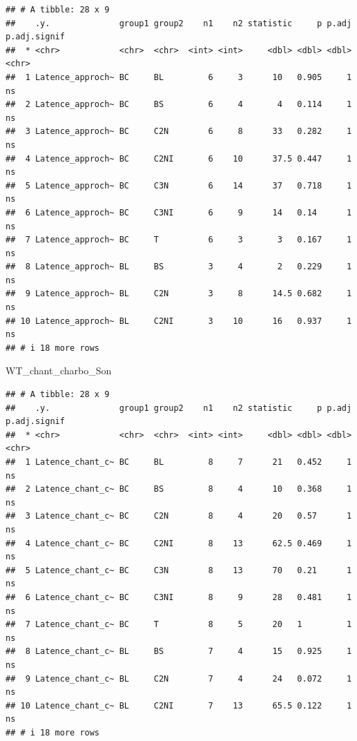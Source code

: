 \documentclass[
  french,
]{article}
\newenvironment{Shaded}{\begin{snugshade}}{\end{snugshade}}
\newcommand{\NormalTok}[1]{#1}
\begin{document}
\begin{verbatim}
## # A tibble: 28 x 9
##    .y.              group1 group2    n1    n2 statistic     p p.adj p.adj.signif
##  * <chr>            <chr>  <chr>  <int> <int>     <dbl> <dbl> <dbl> <chr>       
##  1 Latence_approch~ BC     BL         6     3      10   0.905     1 ns          
##  2 Latence_approch~ BC     BS         6     4       4   0.114     1 ns          
##  3 Latence_approch~ BC     C2N        6     8      33   0.282     1 ns          
##  4 Latence_approch~ BC     C2NI       6    10      37.5 0.447     1 ns          
##  5 Latence_approch~ BC     C3N        6    14      37   0.718     1 ns          
##  6 Latence_approch~ BC     C3NI       6     9      14   0.14      1 ns          
##  7 Latence_approch~ BC     T          6     3       3   0.167     1 ns          
##  8 Latence_approch~ BL     BS         3     4       2   0.229     1 ns          
##  9 Latence_approch~ BL     C2N        3     8      14.5 0.682     1 ns          
## 10 Latence_approch~ BL     C2NI       3    10      16   0.937     1 ns          
## # i 18 more rows
\end{verbatim}

\begin{Shaded}
\begin{Highlighting}[]
\NormalTok{WT\_chant\_charbo\_Son}
\end{Highlighting}
\end{Shaded}

\begin{verbatim}
## # A tibble: 28 x 9
##    .y.              group1 group2    n1    n2 statistic     p p.adj p.adj.signif
##  * <chr>            <chr>  <chr>  <int> <int>     <dbl> <dbl> <dbl> <chr>       
##  1 Latence_chant_c~ BC     BL         8     7      21   0.452     1 ns          
##  2 Latence_chant_c~ BC     BS         8     4      10   0.368     1 ns          
##  3 Latence_chant_c~ BC     C2N        8     4      20   0.57      1 ns          
##  4 Latence_chant_c~ BC     C2NI       8    13      62.5 0.469     1 ns          
##  5 Latence_chant_c~ BC     C3N        8    13      70   0.21      1 ns          
##  6 Latence_chant_c~ BC     C3NI       8     9      28   0.481     1 ns          
##  7 Latence_chant_c~ BC     T          8     5      20   1         1 ns          
##  8 Latence_chant_c~ BL     BS         7     4      15   0.925     1 ns          
##  9 Latence_chant_c~ BL     C2N        7     4      24   0.072     1 ns          
## 10 Latence_chant_c~ BL     C2NI       7    13      65.5 0.122     1 ns          
## # i 18 more rows
\end{verbatim}
\end{document}
